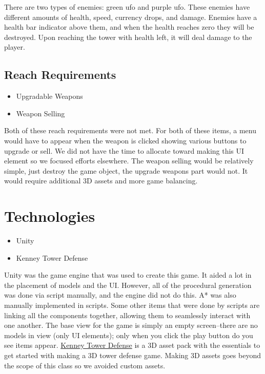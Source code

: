 \documentclass{article}
\begin{document}
There are two types of enemies: green ufo and purple ufo. These enemies have different amounts of health, speed, currency drops, and damage. Enemies have a health bar indicator above them, and when the health reaches zero they will be destroyed. Upon reaching the tower with health left, it will deal damage to the player.

\subsection{Reach Requirements}

\begin{itemize}
    \item Upgradable Weapons
    \item Weapon Selling
\end{itemize}

Both of these reach requirements were not met. For both of these items, a menu would have to appear when the weapon is clicked showing various buttons to upgrade or sell. We did not have the time to allocate toward making this UI element so we focused efforts elsewhere. The weapon selling would be relatively simple, just destroy the game object, the upgrade weapons part would not. It would require additional 3D assets and more game balancing.

\section{Technologies}
\label{sec:Technologies}

\begin{itemize}
    \item Unity
    \item Kenney Tower Defense
\end{itemize}

Unity was the game engine that was used to create this game. It aided a lot in the placement of models and the UI. However, all of the procedural generation was done via script manually, and the engine did not do this. A* was also manually implemented in scripts. Some other items that were done by scripts are linking all the components together, allowing them to seamlessly interact with one another. The base view for the game is simply an empty screen--there are no models in view (only UI elements); only when you click the play button do you see items appear. \hyperref[sec:References]{Kenney Tower Defense} is a 3D asset pack with the essentials to get started with making a 3D tower defense game. Making 3D assets goes beyond the scope of this class so we avoided custom assets.
\end{document}
